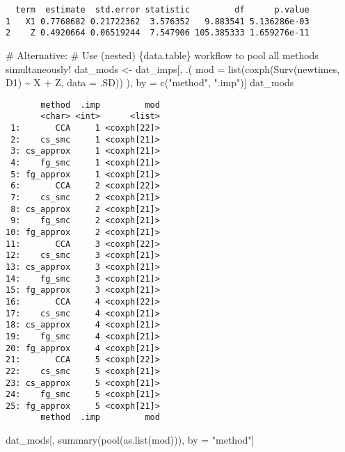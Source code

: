 \documentclass[
  12pt,
  a4paper,
]{article}
\newenvironment{Shaded}{\begin{snugshade}}{\end{snugshade}}
\newcommand{\AttributeTok}[1]{\textcolor[rgb]{0.40,0.45,0.13}{#1}}
\newcommand{\CommentTok}[1]{\textcolor[rgb]{0.37,0.37,0.37}{#1}}
\newcommand{\FunctionTok}[1]{\textcolor[rgb]{0.28,0.35,0.67}{#1}}
\newcommand{\NormalTok}[1]{\textcolor[rgb]{0.00,0.23,0.31}{#1}}
\newcommand{\OtherTok}[1]{\textcolor[rgb]{0.00,0.23,0.31}{#1}}
\newcommand{\SpecialCharTok}[1]{\textcolor[rgb]{0.37,0.37,0.37}{#1}}
\newcommand{\StringTok}[1]{\textcolor[rgb]{0.13,0.47,0.30}{#1}}
\begin{document}
\begin{verbatim}
  term  estimate  std.error statistic         df      p.value
1   X1 0.7768682 0.21722362  3.576352   9.883541 5.136286e-03
2    Z 0.4920664 0.06519244  7.547906 105.385333 1.659276e-11
\end{verbatim}

\begin{Shaded}
\begin{Highlighting}[]
\CommentTok{\# Alternative: }
\CommentTok{\# Use (nested) \{data.table\} workflow to pool all methods simultaneously!}
\NormalTok{dat\_mods }\OtherTok{\textless{}{-}}\NormalTok{ dat\_imps[, .(}
  \AttributeTok{mod =} \FunctionTok{list}\NormalTok{(}\FunctionTok{coxph}\NormalTok{(}\FunctionTok{Surv}\NormalTok{(newtimes, D1) }\SpecialCharTok{\textasciitilde{}}\NormalTok{ X }\SpecialCharTok{+}\NormalTok{ Z, }\AttributeTok{data =}\NormalTok{ .SD))}
\NormalTok{), by }\OtherTok{=} \FunctionTok{c}\NormalTok{(}\StringTok{"method"}\NormalTok{, }\StringTok{".imp"}\NormalTok{)]}
\NormalTok{dat\_mods}
\end{Highlighting}
\end{Shaded}

\begin{verbatim}
       method  .imp         mod
       <char> <int>      <list>
 1:       CCA     1 <coxph[22]>
 2:    cs_smc     1 <coxph[21]>
 3: cs_approx     1 <coxph[21]>
 4:    fg_smc     1 <coxph[21]>
 5: fg_approx     1 <coxph[21]>
 6:       CCA     2 <coxph[22]>
 7:    cs_smc     2 <coxph[21]>
 8: cs_approx     2 <coxph[21]>
 9:    fg_smc     2 <coxph[21]>
10: fg_approx     2 <coxph[21]>
11:       CCA     3 <coxph[22]>
12:    cs_smc     3 <coxph[21]>
13: cs_approx     3 <coxph[21]>
14:    fg_smc     3 <coxph[21]>
15: fg_approx     3 <coxph[21]>
16:       CCA     4 <coxph[22]>
17:    cs_smc     4 <coxph[21]>
18: cs_approx     4 <coxph[21]>
19:    fg_smc     4 <coxph[21]>
20: fg_approx     4 <coxph[21]>
21:       CCA     5 <coxph[22]>
22:    cs_smc     5 <coxph[21]>
23: cs_approx     5 <coxph[21]>
24:    fg_smc     5 <coxph[21]>
25: fg_approx     5 <coxph[21]>
       method  .imp         mod
\end{verbatim}

\begin{Shaded}
\begin{Highlighting}[]
\NormalTok{dat\_mods[, }\FunctionTok{summary}\NormalTok{(}\FunctionTok{pool}\NormalTok{(}\FunctionTok{as.list}\NormalTok{(mod))), by }\OtherTok{=} \StringTok{"method"}\NormalTok{]}
\end{Highlighting}
\end{Shaded}
\end{document}
